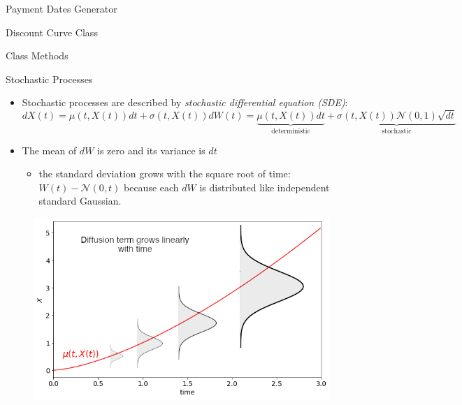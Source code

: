 \documentclass{beamer}
\begin{document}
\begin{frame}[fragile]{Payment Dates Generator}
\begin{itemize}
\begin{frame}{Discount Curve Class}
\begin{frame}{Class Methods}
\begin{itemize}
\begin{iptyhon}
\begin{frame}{Stochastic Processes}
\begin{itemize}
\item Stochastic processes are described by \emph{stochastic differential equation (SDE)}:
\begin{equation*}
dX(t) = \mu(t,X(t)) dt + \sigma(t,X(t)) dW(t) = \underbrace{\mu(t,X(t))dt}_{\textrm{deterministic}} + \underbrace{\sigma(t,X(t)) \mathcal{N}(0,1)\sqrt{dt}}_{\textrm{stochastic}}
\end{equation*}
\item The mean of $dW$ is zero and its variance is $dt$
   \begin{itemize}
    \item the standard deviation grows with the square root of time: $W(t) - \mathcal{N}( 0, t )$ because each $dW$ is distributed like independent standard Gaussian.
    \end{itemize}
\end{itemize}
\begin{figure}[h]
    \begin{center}
    \includegraphics[width=0.50\linewidth]{brownian_process}
    \end{center}
\end{figure}        
\end{frame}


\end{iptyhon}
\end{itemize}
\end{frame}
\end{frame}
\end{itemize}
\end{frame}
\end{document}
